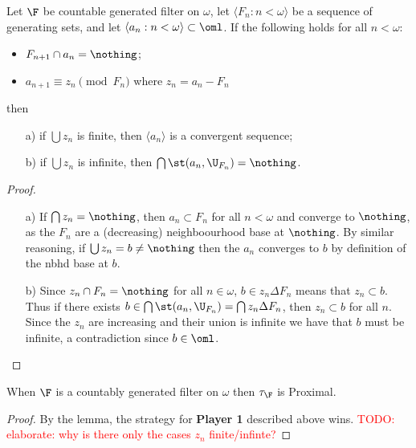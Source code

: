 \documentclass{article}
\begin{document}
\begin{lem}
    Let \(\F\) be countable generated filter on \(\omega\), let \(\langle F_n : n < \omega\rangle\) be a sequence of generating sets, and let \(\langle a_n : n < \omega\rangle \subset \oml\). If the following holds for all \(n < \omega\):
    \begin{itemize}
        \item \(F_{n + 1} \cap a_n = \nothing\);
        \item \(a_{n + 1} \equiv z_n \pmod {F_n}\) where \(z_n = a_n - F_n\)
    \end{itemize}
    then 
    \begin{enumerate}
        \item[a)] if \(\bigcup z_n\) is finite, then \(\langle a_n \rangle\) is a convergent sequence;
        \item[b)] if \(\bigcup z_n\) is infinite, then \(\bigcap \st(a_n, \U_{F_n}) = \nothing\).
    \end{enumerate}
\end{lem}
\begin{proof}
    \leavevmode
    \begin{enumerate}
        \item[a)] If \(\bigcap z_n = \nothing\), then \(a_n \subset F_n\) for all \(n < \omega\) and converge to \(\nothing\), as the \(F_n\) are a (decreasing) neighboourhood base at \(\nothing\). By similar reasoning, if \(\bigcup z_n = b \neq \nothing\) then the \(a_n\) converges to \(b\) by definition of the nbhd base at \(b\).
        \item[b)] Since \(z_n\cap F_n = \nothing\) for all \(n \in \omega\), \(b \in z_n \Delta F_n\) means that \(z_n \subset b\). Thus if there exists \(b \in \bigcap \st(a_n, \U_{F_n}) = \bigcap z_n\Delta F_n\), then \(z_n \subset b\) for all \(n\). Since the \(z_n\) are increasing and their union is infinite we have that \(b\) must be infinite, a contradiction since \(b \in \oml\).
    \end{enumerate}
\end{proof}
\begin{prop}
    When \(\F\) is a countably generated filter on \(\omega\) then \(\tau_{\F}\) is Proximal.
\end{prop}
\begin{proof}
    By the lemma, the strategy for \textbf{Player 1} described above wins. \textcolor{red}{TODO: elaborate: why is there only the cases $z_n$ finite/infinte?}
\end{proof}
\end{document}
